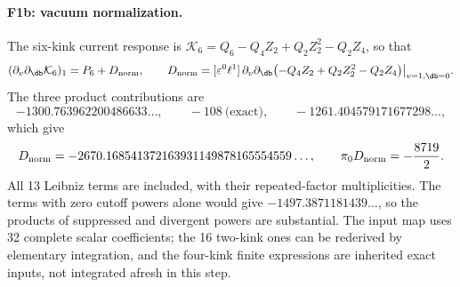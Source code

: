 \paragraph{F1b: vacuum normalization.} The six-kink current response is
$\mathcal K_6=Q_6-Q_4Z_2+Q_2Z_2^2-Q_2Z_4$, so that
\begin{equation}
 (\partial_v\partial_{\db}\mathcal K_6)_1=P_6+D_{\rm norm},\qquad
 D_{\rm norm}=[\varepsilon^0\ell^1]\,\partial_v\partial_{\db}\bigl(-Q_4Z_2+Q_2Z_2^2-Q_2Z_4\bigr)\big|_{v=1,\db=0}.
\end{equation}
The three product contributions are
\begin{equation}
 -1300.763962200486633\ldots,\qquad -108\ \text{(exact)},\qquad -1261.404579171677298\ldots,
\end{equation}
which give
\begin{equation}
 D_{\rm norm}=-2670.168541372163931149878165554559\ldots,\qquad \pi_0D_{\rm norm}=-\frac{8719}{2}.
\end{equation}
All 13 Leibniz terms are included, with their repeated-factor multiplicities. The terms with zero cutoff powers alone
would give $-1497.3871181439\ldots$, so the products of suppressed and divergent powers are substantial. The input map
uses 32 complete scalar coefficients; the 16 two-kink ones can be rederived by elementary integration, and the
four-kink finite expressions are inherited exact inputs, not integrated afresh in this step.

